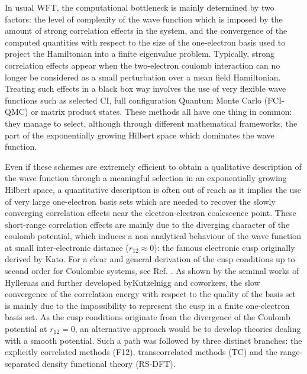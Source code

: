 \documentclass[aip,jcp,reprint,noshowkeys,superscriptaddress,twocolumn]{revtex4-1}
\begin{document}
In usual WFT, the computational bottleneck is mainly determined by two factors: the level of complexity of the wave function which is imposed by the amount of strong correlation effects in the system, and the convergence of the computed quantities with respect to the size of the one-electron basis used to project the Hamiltonian into a finite eigenvalue problem. 
Typically, strong correlation effects appear when the two-electron coulomb interaction can no longer be considered as a small perturbation over a mean field Hamiltonian. Treating such effects in a black box way involves the use of very flexible wave functions such as 
selected CI\cite{bender,HurMalRan-JCP-73,buenker1,buenker-book,three_class_CIPSI,harrison,cele_cipsi_3_spaces,cele_cipsi_zeroth_order,GinSceCaf-CJC-13, GinSceCaf-JCP-15, ShaHolJeaAlaUmr-JCTC-17}, 
full configuration Quantum Monte Carlo\cite{BooThoAla-JCP-09,BooAla-JCP-10,BooCleThoAla-JCP-11,GhaLozAla-JCP-19,VitAlaKat-JCTC-20} (FCI-QMC) or matrix product states\cite{ChaSha-AR-11,BaiRei-JCP-20}. These methods all have one thing in common: they manage to select, although through different mathematical frameworks, the part of the exponentially growing Hilbert space which dominates the wave function. 

Even if these schemes are extremely efficient to obtain a qualitative description of the wave function through a meaningful selection in an exponentially growing Hilbert space, a quantitative description is often out of reach as it implies the use of very large one-electron basis sets which are needed to recover the slowly converging correlation effects near the electron-electron coalescence point. 
These short-range correlation effects are mainly due to the diverging character of the coulomb potential, which induces a non analytical behaviour of the wave function at small inter-electronic distance ($r_{12}\approx 0$): the famous electronic cusp originally derived by Kato\cite{Kat-CPAM-57}. For a clear and general derivation of the cusp conditions up to second order for Coulombic systems, see Ref. . As shown by the seminal works of Hylleraas\cite{Hyl-ZP-29} and further developed byKutzelnigg and coworkers, \cite{Kut-TCA-85,KutKlo-JCP-91, NogKut-JCP-94} the slow convergence of the correlation energy with respect to the quality of the basis set is mainly due to the impossibility to represent the cusp in a finite one-electron basis set. 
As the cusp conditions originate from the divergence of the Coulomb potential at $r_{12}=0$, an alternative approach would be to develop theories dealing with a smooth potential. Such a path was followed by three distinct branches: 
the explicitly correlated methods (F12), transcorrelated methods (TC) and the range-separated density functional theory (RS-DFT). 
\end{document}

